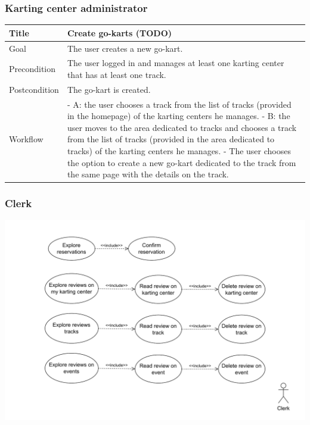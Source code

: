 \documentclass{beamer}
\begin{document}
\begin{frame}
    \frametitle{Karting center administrator}
    \begin{table}
        \tiny
        \begin{tabular}{|p{2cm}|p{6cm}|}
        \hline  
        Title & \textbf{Create go-karts (TODO)} \\
        \hline
        Goal & The user creates a new go-kart. \\
        \hline
        Precondition & The user logged in and manages at least one karting center that has at least
        one track. \\
        \hline
        Postcondition & The go-kart is created. \\
        \hline
        Workflow &
        - A: the user chooses a track from the list of tracks (provided in the homepage)
        of the karting centers
        he manages. \newline
        - B: the user moves to the area dedicated to tracks and chooses a track from the list of tracks
        (provided in the area dedicated to tracks) of the karting centers he manages. \newline
        - The user chooses the option to create a new go-kart dedicated to the track 
        from the same page with the details on the track. \\
        \hline
        \end{tabular}
\end{table}
\end{frame}


\begin{frame}
    \frametitle{Clerk}
    \centering
    \includegraphics[width=0.9\linewidth]{drawio/clerk.pdf}
\end{frame}
\end{document}
